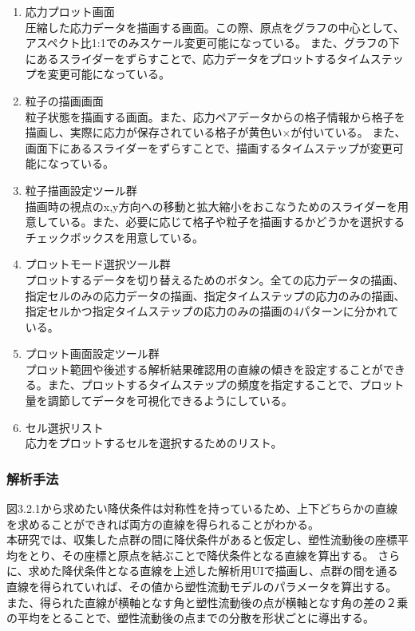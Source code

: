 \documentclass[12pt]{ltjsarticle}
\begin{document}
\begin{enumerate}
  \item 応力プロット画面 \\
  圧縮した応力データを描画する画面。この際、原点をグラフの中心として、アスペクト比1:1でのみスケール変更可能になっている。
  また、グラフの下にあるスライダーをずらすことで、応力データをプロットするタイムステップを変更可能になっている。
  \item 粒子の描画画面 \\
  粒子状態を描画する画面。また、応力ペアデータからの格子情報から格子を描画し、実際に応力が保存されている格子が黄色い×が付いている。
  また、画面下にあるスライダーをずらすことで、描画するタイムステップが変更可能になっている。
  \item 粒子描画設定ツール群 \\
  描画時の視点のx,y方向への移動と拡大縮小をおこなうためのスライダーを用意している。また、必要に応じて格子や粒子を描画するかどうかを選択するチェックボックスを用意している。
  \item プロットモード選択ツール群 \\
  プロットするデータを切り替えるためのボタン。全ての応力データの描画、指定セルのみの応力データの描画、指定タイムステップの応力のみの描画、指定セルかつ指定タイムステップの応力のみの描画の4パターンに分かれている。
  \item プロット画面設定ツール群 \\
  プロット範囲や後述する解析結果確認用の直線の傾きを設定することができる。また、プロットするタイムステップの頻度を指定することで、プロット量を調節してデータを可視化できるようにしている。
  \item セル選択リスト \\
  応力をプロットするセルを選択するためのリスト。
\end{enumerate}

\subsubsection{解析手法}
図3.2.1から求めたい降伏条件は対称性を持っているため、上下どちらかの直線を求めることができれば両方の直線を得られることがわかる。\\
本研究では、収集した点群の間に降伏条件があると仮定し、塑性流動後の座標平均をとり、その座標と原点を結ぶことで降伏条件となる直線を算出する。
さらに、求めた降伏条件となる直線を上述した解析用UIで描画し、点群の間を通る直線を得られていれば、その値から塑性流動モデルのパラメータを算出する。
また、得られた直線が横軸となす角と塑性流動後の点が横軸となす角の差の２乗の平均をとることで、塑性流動後の点までの分散を形状ごとに導出する。
\end{document}
